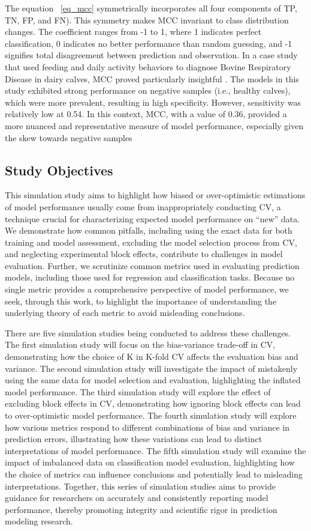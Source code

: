 The equation ~\ref{eq_mcc} symmetrically incorporates all four components of TP, TN, FP, and FN). This symmetry makes MCC invariant to class distribution changes. The coefficient ranges from -1 to 1, where 1 indicates perfect classification, 0 indicates no better performance than random guessing, and -1 signifies total disagreement between prediction and observation. In a case study that used feeding and daily activity behaviors to diagnose Bovine Respiratory Disease in dairy calves, MCC proved particularly insightful \citep{bowen_early_2021}. The models in this study exhibited strong performance on negative samples (i.e., healthy calves), which were more prevalent, resulting in high specificity. However, sensitivity was relatively low at 0.54. In this context, MCC, with a value of 0.36, provided a more nuanced and representative measure of model performance, especially given the skew towards negative samples

\subsection{Study Objectives}

This simulation study aims to highlight how biased or over-optimistic estimations of model performance usually come from inappropriately conducting CV, a technique crucial for characterizing expected model performance on “new” data. We demonstrate how common pitfalls, including using the exact data for both training and model assessment, excluding the model selection process from CV, and neglecting experimental block effects, contribute to challenges in model evaluation. Further, we scrutinize common metrics used in evaluating prediction models, including those used for regression and classification tasks. Because no single metric provides a comprehensive perspective of model performance, we seek, through this work, to highlight the importance of understanding the underlying theory of each metric to avoid misleading conclusions.

There are five simulation studies being conducted to address these challenges. The first simulation study will focus on the bias-variance trade-off in CV, demonstrating how the choice of K in K-fold CV affects the evaluation bias and variance. The second simulation study will investigate the impact of mistakenly using the same data for model selection and evaluation, highlighting the inflated model performance. The third simulation study will explore the effect of excluding block effects in CV, demonstrating how ignoring block effects can lead to over-optimistic model performance. The fourth simulation study will explore how various metrics respond to different combinations of bias and variance in prediction errors, illustrating how these variations can lead to distinct interpretations of model performance. The fifth simulation study will examine the impact of imbalanced data on classification model evaluation, highlighting how the choice of metrics can influence conclusions and potentially lead to misleading interpretations. Together, this series of simulation studies aims to provide guidance for researchers on accurately and consistently reporting model performance, thereby promoting integrity and scientific rigor in prediction modeling research.
